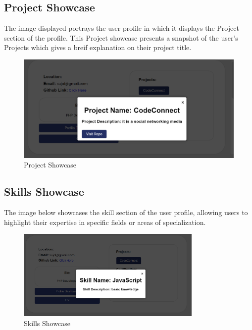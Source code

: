 \subsection{Project Showcase}
The image displayed portrays the user profile in which it displays the Project section of the profile. This Project showcase presents a snapshot of the user's Projects which gives a breif explanation on their project title.
\begin{figure}[H]
    \centering
    \includegraphics[width=1\textwidth]{Outcome-ss/project-showcase.png}
    \caption{Project Showcase}
    \label{fig:Project Showcase}
\end{figure}


\subsection{Skills Showcase}
The image below showcases the skill section of the user profile, allowing users to highlight their expertise in specific fields or areas of specialization. 
\begin{figure}[H]
    \centering
    \includegraphics[width=0.8\textwidth]{Outcome-ss/skill-showcase.png}
    \caption{Skills Showcase}
    \label{fig:Skills Showcase}
\end{figure}
